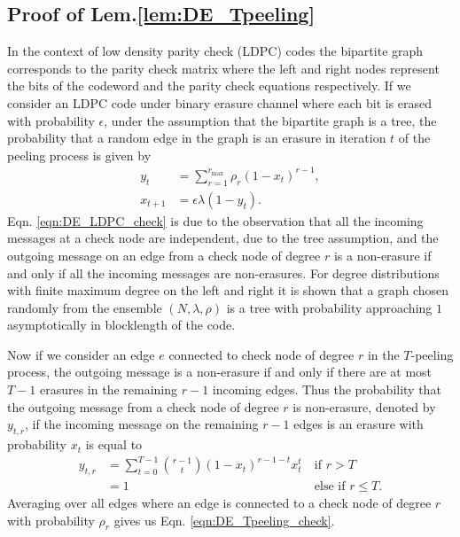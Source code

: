 \subsection{Proof of Lem.\ref{lem:DE_Tpeeling}}
\label{appendix:proof_DE_Tpeeling}
In the context of low density parity check (LDPC) codes the bipartite graph corresponds to the parity check matrix where the left and right nodes represent the bits of the codeword and the parity check equations respectively. If we consider an LDPC code under binary erasure channel where each bit is erased with probability $\epsilon$, under the assumption that the bipartite graph is a tree, the probability that a random edge in the graph is an erasure in iteration $t$ of the peeling process is given by \cite{richardson2008modern}
\begin{align}
y_{t}&=\sum_{r=1}^{r_{\max}} \rho_r (1-x_t)^{r-1}, \label{eqn:DE_LDPC_check}\\
x_{t+1}&=\epsilon \lambda(1-y_t).\label{eqn:DE_LDPC_bit}
\end{align}
Eqn. \eqref{eqn:DE_LDPC_check} is due to the observation that all the incoming messages at a check node are independent, due to the tree assumption, and the outgoing message on an edge from a check node of degree $r$ is a non-erasure if and only if all the incoming messages are non-erasures. For degree distributions with finite maximum degree on the left and right it is shown that a graph chosen randomly from the ensemble $(N,\lambda,\rho)$ is a tree with probability approaching $1$ asymptotically in blocklength of the code.

Now if we consider an edge $e$ connected to check node of degree $r$ in the $T$-peeling process, the outgoing message is a non-erasure if and only if there are at most $T-1$ erasures in the remaining $r-1$ incoming edges. Thus the probability that the outgoing message from a check node of degree $r$ is non-erasure, denoted by $y_{t,r}$, if the incoming message on the remaining $r-1$ edges is an erasure with probability $x_t$ is equal to
\begin{align*}
y_{t,r}&=\sum_{t=0}^{T-1}\binom{r-1}{t}(1-x_t)^{r-1-t} x_t^{t}  ~&\text{if } r>T\\
&=1 ~&\text{else if } r\leq T.
\end{align*}
Averaging over all edges where an edge is connected to a check node of degree $r$ with probability $\rho_r$ gives us Eqn. \eqref{eqn:DE_Tpeeling_check}.


